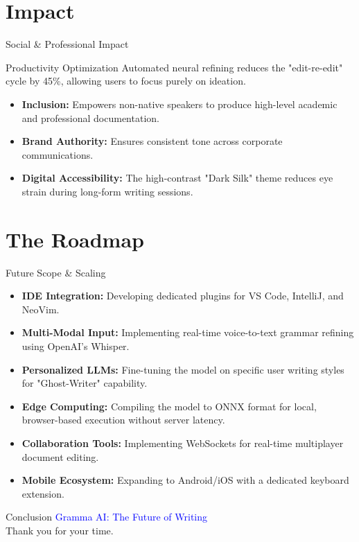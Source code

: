 \documentclass{beamer}
\begin{document}
\section{Impact}
\begin{frame}{Social \& Professional Impact}
    \begin{alertblock}{Productivity Optimization}
        Automated neural refining reduces the "edit-re-edit" cycle by 45\%, allowing users to focus purely on ideation.
    \end{alertblock}
    \begin{itemize}
        \item \textbf{Inclusion:} Empowers non-native speakers to produce high-level academic and professional documentation.
        \item \textbf{Brand Authority:} Ensures consistent tone across corporate communications.
        \item \textbf{Digital Accessibility:} The high-contrast "Dark Silk" theme reduces eye strain during long-form writing sessions.
    \end{itemize}
\end{frame}

\section{The Roadmap}
\begin{frame}{Future Scope \& Scaling}
    \begin{itemize}
        \item \textbf{IDE Integration:} Developing dedicated plugins for VS Code, IntelliJ, and NeoVim.
        \item \textbf{Multi-Modal Input:} Implementing real-time voice-to-text grammar refining using OpenAI's Whisper.
        \item \textbf{Personalized LLMs:} Fine-tuning the model on specific user writing styles for "Ghost-Writer" capability.
        \item \textbf{Edge Computing:} Compiling the model to ONNX format for local, browser-based execution without server latency.
        \item \textbf{Collaboration Tools:} Implementing WebSockets for real-time multiplayer document editing.
        \item \textbf{Mobile Ecosystem:} Expanding to Android/iOS with a dedicated keyboard extension.
    \end{itemize}
\end{frame}

\begin{frame}{Conclusion}
    \centering
    \Huge \textcolor{blue}{Gramma AI: The Future of Writing} \\
    \vspace{20pt}
    \large Thank you for your time. \\
    
\end{frame}
\end{document}
